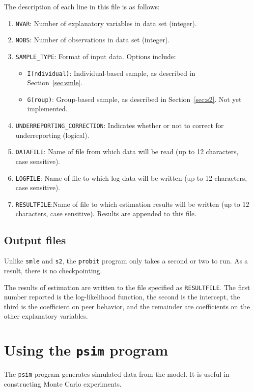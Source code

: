 \documentclass{article}
\begin{document}
The description of each line in this file is as follows:
\begin{enumerate}
\item {\tt NVAR}: Number of explanatory variables in data set (integer).
\item {\tt NOBS}: Number of observations in data set (integer).
\item {\tt SAMPLE\_TYPE}: Format of input data.  Options include:
	\begin{itemize}
		\item {\tt I(ndividual)}: Individual-based sample, as described in Section~\ref{sec:smle}.
		\item {\tt G(roup)}: Group-based sample, as described in Section~\ref{sec:s2}.  Not yet implemented.
	\end{itemize}
\item {\tt UNDERREPORTING\_{}CORRECTION}: Indicates whether or not to correct for underreporting (logical).
\item {\tt DATAFILE}: Name of file from which data will be read (up to 12 characters, case sensitive).
\item {\tt LOGFILE}: Name of file to which log data will be written (up to 12 characters, case sensitive).
\item {\tt RESULTFILE}:Name of file to which estimation results will be written (up to 12 characters, case sensitive).  	Results	are appended to this file.
\end{enumerate}

\subsection{Output files}

Unlike {\tt smle} and {\tt s2}, the {\tt probit} program only takes a second or two to 
run.  As a result, there is no checkpointing.

The results of estimation are written to the file specified as {\tt RESULTFILE}.
The first number reported is the log-likelihood function, the second is the intercept,
the third is the coefficient on peer behavior, and the remainder are coefficients
on the other explanatory variables.


\section{Using the {\tt psim} program}\label{sec:psim}

The {\tt psim} program generates simulated data from the model.  It is useful
in constructing Monte Carlo experiments.
\end{document}
